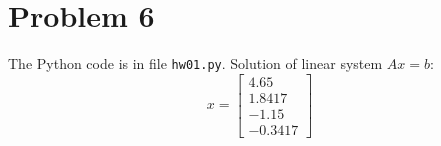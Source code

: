 \documentclass[letter, 12pt]{article}
\begin{document}

\section*{Problem 6}

The Python code is in file \texttt{hw01.py}. Solution of linear system $Ax = b$:
\begin{equation*}
	x = 
	\begin{bmatrix}
		4.65		\\
		1.8417	\\
		-1.15		\\
		-0.3417
	\end{bmatrix}
\end{equation*}



%
%
\end{document}
